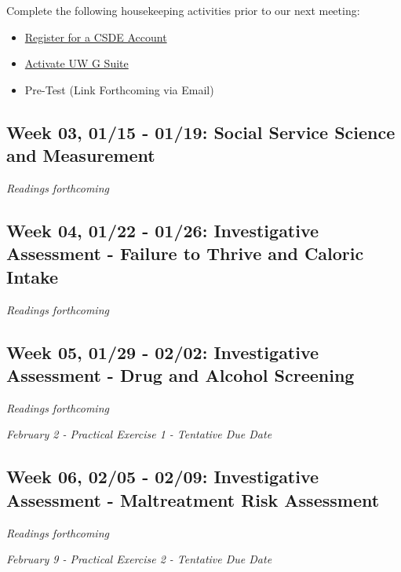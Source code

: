 \documentclass[11pt,]{article}
\providecommand{\tightlist}{%
  \setlength{\itemsep}{0pt}\setlength{\parskip}{0pt}}
\begin{document}
Complete the following housekeeping activities prior to our next
meeting:

\begin{itemize}
\tightlist
\item
  \href{https://csde.washington.edu/netid/account/new.php/}{Register for
  a CSDE Account}
\item
  \href{https://itconnect.uw.edu/connect/email/google-apps/getting-started/\#activate}{Activate
  UW G Suite}
\item
  Pre-Test (Link Forthcoming via Email)
\end{itemize}

\subsection{Week 03, 01/15 - 01/19: Social Service Science and
Measurement}\label{week-03-0115---0119-social-service-science-and-measurement}

\emph{Readings forthcoming}

\subsection{Week 04, 01/22 - 01/26: Investigative Assessment - Failure
to Thrive and Caloric
Intake}\label{week-04-0122---0126-investigative-assessment---failure-to-thrive-and-caloric-intake}

\emph{Readings forthcoming}

\subsection{Week 05, 01/29 - 02/02: Investigative Assessment - Drug and
Alcohol
Screening}\label{week-05-0129---0202-investigative-assessment---drug-and-alcohol-screening}

\emph{Readings forthcoming}

\emph{February 2 - Practical Exercise 1 - Tentative Due Date}

\subsection{Week 06, 02/05 - 02/09: Investigative Assessment -
Maltreatment Risk
Assessment}\label{week-06-0205---0209-investigative-assessment---maltreatment-risk-assessment}

\emph{Readings forthcoming}

\emph{February 9 - Practical Exercise 2 - Tentative Due Date}
\end{document}
